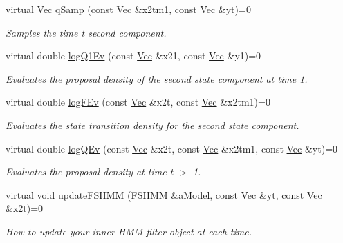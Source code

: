\begin{DoxyCompactItemize}
virtual \hyperlink{apf__filter_8h_a4c7df05c6f5e8a0d15ae14bcdbc07152}{Vec} \hyperlink{classHmm__Rbpf_a2394e61d4b4c25b0f6956804625845d4}{q\+Samp} (const \hyperlink{apf__filter_8h_a4c7df05c6f5e8a0d15ae14bcdbc07152}{Vec} \&x2tm1, const \hyperlink{apf__filter_8h_a4c7df05c6f5e8a0d15ae14bcdbc07152}{Vec} \&yt)=0
\begin{DoxyCompactList}\small\item\em Samples the time t second component. \end{DoxyCompactList}\item 
virtual double \hyperlink{classHmm__Rbpf_a6b7d654499d59cff3333ff068fc05f00}{log\+Q1\+Ev} (const \hyperlink{apf__filter_8h_a4c7df05c6f5e8a0d15ae14bcdbc07152}{Vec} \&x21, const \hyperlink{apf__filter_8h_a4c7df05c6f5e8a0d15ae14bcdbc07152}{Vec} \&y1)=0
\begin{DoxyCompactList}\small\item\em Evaluates the proposal density of the second state component at time 1. \end{DoxyCompactList}\item 
virtual double \hyperlink{classHmm__Rbpf_a2225a77385e1c741cd49e2f05e432ca9}{log\+F\+Ev} (const \hyperlink{apf__filter_8h_a4c7df05c6f5e8a0d15ae14bcdbc07152}{Vec} \&x2t, const \hyperlink{apf__filter_8h_a4c7df05c6f5e8a0d15ae14bcdbc07152}{Vec} \&x2tm1)=0
\begin{DoxyCompactList}\small\item\em Evaluates the state transition density for the second state component. \end{DoxyCompactList}\item 
virtual double \hyperlink{classHmm__Rbpf_a60b56c34a56e3a9090fb4f705f0bdde1}{log\+Q\+Ev} (const \hyperlink{apf__filter_8h_a4c7df05c6f5e8a0d15ae14bcdbc07152}{Vec} \&x2t, const \hyperlink{apf__filter_8h_a4c7df05c6f5e8a0d15ae14bcdbc07152}{Vec} \&x2tm1, const \hyperlink{apf__filter_8h_a4c7df05c6f5e8a0d15ae14bcdbc07152}{Vec} \&yt)=0
\begin{DoxyCompactList}\small\item\em Evaluates the proposal density at time t $>$ 1. \end{DoxyCompactList}\item 
virtual void \hyperlink{classHmm__Rbpf_a3ca8ae39c7d1c52ceaf300b6b2564edf}{update\+F\+S\+H\+MM} (\hyperlink{classFSHMM}{F\+S\+H\+MM} \&a\+Model, const \hyperlink{apf__filter_8h_a4c7df05c6f5e8a0d15ae14bcdbc07152}{Vec} \&yt, const \hyperlink{apf__filter_8h_a4c7df05c6f5e8a0d15ae14bcdbc07152}{Vec} \&x2t)=0
\begin{DoxyCompactList}\small\item\em How to update your inner H\+MM filter object at each time. \end{DoxyCompactList}\end{DoxyCompactItemize}


